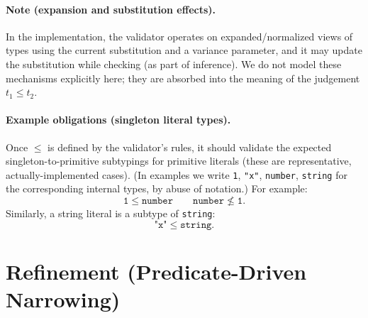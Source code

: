 \documentclass[11pt]{article}
\begin{document}
\paragraph{Note (expansion and substitution effects).}
In the implementation, the validator operates on expanded/normalized views of types using the current substitution
and a variance parameter, and it may update the substitution while checking (as part of inference).
We do not model these mechanisms explicitly here; they are absorbed into the meaning of the judgement $t_1 \leq t_2$.

\paragraph{Example obligations (singleton literal types).}
Once $\leq$ is defined by the validator's rules, it should validate the expected singleton-to-primitive
subtypings for primitive literals (these are representative, actually-implemented cases).
(In examples we write \texttt{1}, \texttt{"x"}, \texttt{number}, \texttt{string} for the corresponding internal types,
by abuse of notation.) For example:
\[
\texttt{1} \leq \texttt{number}
\qquad
\texttt{number} \not\leq \texttt{1}.
\]
Similarly, a string literal is a subtype of \texttt{string}:
\[
\texttt{"x"} \leq \texttt{string}.
\]

\section{Refinement (Predicate-Driven Narrowing)}
\end{document}
